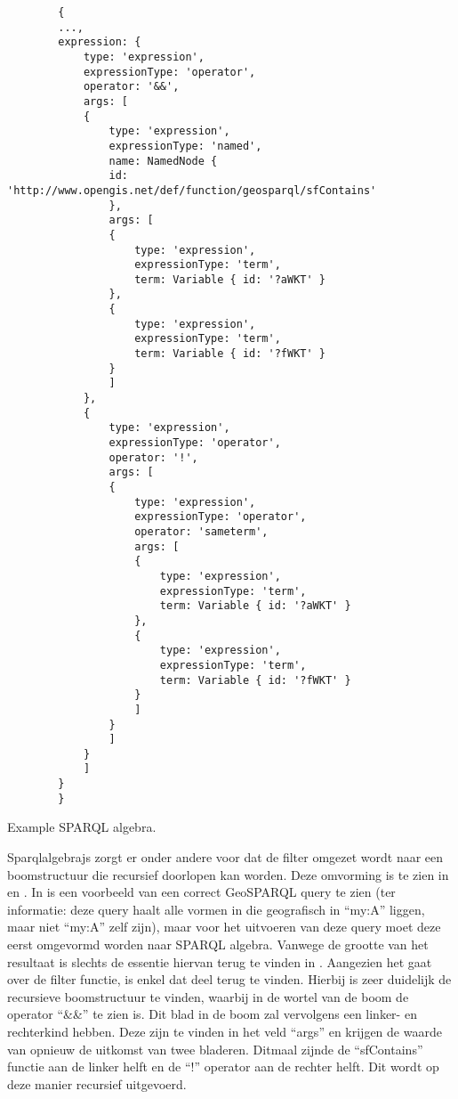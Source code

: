 \begin{listing}[ht]
    \begin{verbatim}
        {
        ...,
        expression: {
            type: 'expression',
            expressionType: 'operator',
            operator: '&&',
            args: [
            {
                type: 'expression',
                expressionType: 'named',
                name: NamedNode {
                id: 'http://www.opengis.net/def/function/geosparql/sfContains'
                },
                args: [
                {
                    type: 'expression',
                    expressionType: 'term',
                    term: Variable { id: '?aWKT' }
                },
                {
                    type: 'expression',
                    expressionType: 'term',
                    term: Variable { id: '?fWKT' }
                }
                ]
            },
            {
                type: 'expression',
                expressionType: 'operator',
                operator: '!',
                args: [
                {
                    type: 'expression',
                    expressionType: 'operator',
                    operator: 'sameterm',
                    args: [
                    {
                        type: 'expression',
                        expressionType: 'term',
                        term: Variable { id: '?aWKT' }
                    },
                    {
                        type: 'expression',
                        expressionType: 'term',
                        term: Variable { id: '?fWKT' }
                    }
                    ]
                }
                ]
            }
            ]
        }
        }
    \end{verbatim}
    \caption{Example SPARQL algebra.}
    \label{listing:sparqlalgebrajs_algebra}
\end{listing}

Sparqlalgebrajs zorgt er onder andere voor dat de filter omgezet wordt naar een boomstructuur die recursief doorlopen kan worden. Deze omvorming is te zien in  en . In  is een voorbeeld van een correct GeoSPARQL query te zien (ter informatie: deze query haalt alle vormen in die geografisch in ``my:A'' liggen, maar niet ``my:A'' zelf zijn), maar voor het uitvoeren van deze query moet deze eerst omgevormd worden naar SPARQL algebra. Vanwege de grootte van het resultaat is slechts de essentie hiervan terug te vinden in . Aangezien het gaat over de filter functie, is enkel dat deel terug te vinden. Hierbij is zeer duidelijk de recursieve boomstructuur te vinden, waarbij in de wortel van de boom de operator ``\&\&'' te zien is. Dit blad in de boom zal vervolgens een linker- en rechterkind hebben. Deze zijn te vinden in het veld ``args'' en krijgen de waarde van opnieuw de uitkomst van twee bladeren. Ditmaal zijnde de ``sfContains'' functie aan de linker helft en de ``!'' operator aan de rechter helft. Dit wordt op deze manier recursief uitgevoerd.

